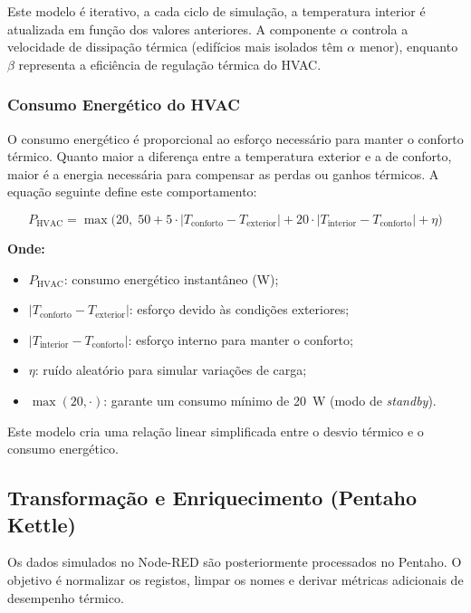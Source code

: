 \documentclass[a4paper, 12pt]{article} %
\begin{document}
Este modelo é iterativo, a cada ciclo de simulação, a temperatura interior é atualizada em função dos valores anteriores.  
A componente $\alpha$ controla a velocidade de dissipação térmica (edifícios mais isolados têm $\alpha$ menor), enquanto $\beta$ representa a eficiência de regulação térmica do HVAC.

\subsubsection*{Consumo Energético do HVAC}

O consumo energético é proporcional ao esforço necessário para manter o conforto térmico.  
Quanto maior a diferença entre a temperatura exterior e a de conforto, maior é a energia necessária para compensar as perdas ou ganhos térmicos.  
A equação seguinte define este comportamento:

\[
P_{\text{HVAC}} = \max \Big(20,\; 50 + 5 \cdot |T_{\text{conforto}} - T_{\text{exterior}}| + 20 \cdot |T_{\text{interior}} - T_{\text{conforto}}| + \eta \Big)
\]

\textbf{Onde:}
\begin{itemize}[nosep]
	\item $P_{\text{HVAC}}$: consumo energético instantâneo (W);
	\item $|T_{\text{conforto}} - T_{\text{exterior}}|$: esforço devido às condições exteriores;
	\item $|T_{\text{interior}} - T_{\text{conforto}}|$: esforço interno para manter o conforto;
	\item $\eta$: ruído aleatório para simular variações de carga;
	\item $\max(20, \cdot)$: garante um consumo mínimo de 20~W (modo de \textit{standby}). \\
\end{itemize}

Este modelo cria uma relação linear simplificada entre o desvio térmico e o consumo energético.

\subsection{Transformação e Enriquecimento (Pentaho Kettle)}

Os dados simulados no Node-RED são posteriormente processados no Pentaho.  
O objetivo é normalizar os registos, limpar os nomes e derivar métricas adicionais de desempenho térmico.
\end{document}
